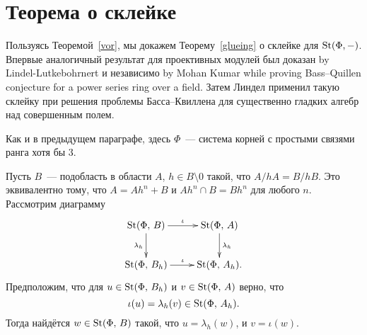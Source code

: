 \documentclass[12pt,a4paper]{article}
\begin{document}
\section{Теорема о склейке}

Пользуясь Теоремой~\ref{vor}, мы докажем Теорему~\ref{glueing} о склейке для $\mathop{\mathrm{St}}\nolimits(\Phi,-)$. Впервые аналогичный результат для проективных модулей был доказан by Lindel-Lutkebohrnert и независимо by Mohan Kumar while proving Bass--Quillen conjecture for a power series ring over a field. Затем Линдел применил такую склейку при решения проблемы Басса--Квиллена для существенно гладких алгебр над совершенным полем.

Как и в предыдущем параграфе, здесь $\Phi$~--- система корней с простыми связями ранга хотя бы 3.

\begin{theorem}
\label{glueing}
Пусть $B$~--- подобласть в области $A$, $h\in B\setminus0$ такой, что $A / hA = B / hB$. Это эквивалентно тому, что $A = Ah^n + B$ и $Ah^n \cap B = Bh^n$ для любого $n$. Рассмотрим диаграмму
$$
\xymatrix{
\St(\Phi,\,B)\ar[r]^{\iota}\ar[d]_{\lambda_h}&\St(\Phi,\,A)\ar[d]^{\lambda_h}\\
\St(\Phi,\,B_h)\ar[r]^{\iota}&\St(\Phi,\,A_h).
}
$$
Предположим, что для $u\in\mathop{\mathrm{St}}\nolimits(\Phi,\,B_h)$ и $v\in\mathop{\mathrm{St}}\nolimits(\Phi,\,A)$ верно, что $$\iota(u)=\lambda_h(v)\in\mathop{\mathrm{St}}\nolimits(\Phi,\,A_h).$$
Тогда найдётся $w\in\mathop{\mathrm{St}}\nolimits(\Phi,\,B)$ такой, что $u=\lambda_h(w)$, и $v=\iota(w)$.
\end{theorem}
\end{document}
